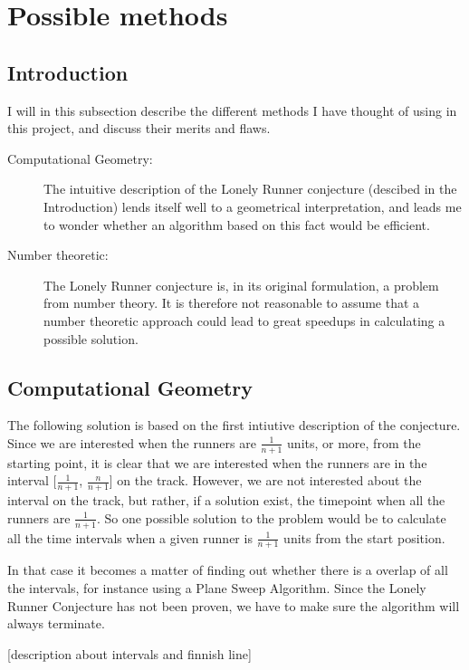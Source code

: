 \section{Possible methods}
\label{choiceOfMethod}

\subsection{Introduction}
I will in this subsection describe the different methods I have thought of using in this project, and discuss their merits and flaws.

\begin{description}
\item[Computational Geometry:] The intuitive description of the Lonely Runner conjecture (descibed in the Introduction) lends itself well to a geometrical interpretation, and leads me to wonder whether an algorithm based on this fact would be efficient.

\item[Number theoretic:] The Lonely Runner conjecture is, in its original formulation, a problem from number theory. It is therefore not reasonable to assume that a number theoretic approach could lead to great speedups in calculating a possible solution.
\end{description}

\subsection{Computational Geometry}
The following solution is based on the first intiutive description of the conjecture. Since we are interested when the runners are $\frac{1}{n + 1}$ units, or more, from the starting point, it is clear that we are interested when the runners are in the interval [$\frac{1}{n + 1}$, $\frac{n}{n + 1}$] on the track. However, we are not interested about the interval on the track, but rather, if a solution exist, the timepoint when all the runners are $\frac{1}{n+1}$. So one possible solution to the problem would be to calculate all the time intervals when a given runner is $\frac{1}{n+1}$ units from the start position. 

In that case it becomes a matter of finding out whether there is a overlap of all the intervals, for instance using a Plane Sweep Algorithm. Since the Lonely Runner Conjecture has not been proven, we have to make sure the algorithm will always terminate.  

[description about intervals and finnish line]

